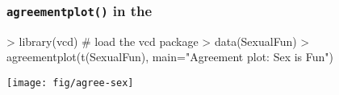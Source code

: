 \renewcommand{\FileName}{agree-Sex-R}
\begin{frame}[fragile]
\frametitle{\texttt{agreementplot()} in the }
\begin{Rin}[fontsize=\footnotesize]
> library(vcd)        # load the vcd package
> data(SexualFun)
> agreementplot(t(SexualFun), main="Agreement plot: Sex is Fun")
\end{Rin}
\begin{center}
\texttt{[image: fig/agree-sex]}
 \end{center}
\end{frame}